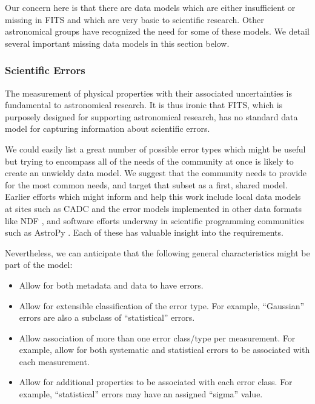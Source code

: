 \documentclass[final,authoryear,5p,times,twocolumn]{elsarticle}
\begin{document}
{{Our concern here is that there are data models which are either
insufficient or missing in FITS and which are very basic to scientific
research. Other astronomical groups have recognized the need for some of
these models. We detail
several important missing data models in this section below.

\subsubsection{Scientific Errors}


The measurement of physical properties with their associated uncertainties 
is fundamental to astronomical
research. It is thus ironic that FITS, which is purposely designed for
supporting astronomical research, has no standard data model for
capturing information about scientific errors.


We could easily list a great number of possible error types which
might be useful but trying to encompass all of the needs of the
community at once is likely to create an unwieldy data model. We
suggest that the community needs to provide for the most common needs,
and target that subset as a first, shared model. Earlier efforts which
might inform and help this work include local data models at sites
such as CADC \citep{2012ASPC..461..339D} and the error
models implemented in other data formats like NDF
\citep[although see for example][]{1991STARB...8...19M}, and software
efforts underway in scientific programming communities such as AstroPy
\citep{2013A&A...558A..33A}. Each of these has valuable insight into
the requirements.


Nevertheless, we can anticipate that the following general
characteristics might be part of the model:

\begin{itemize}
\item Allow for both metadata and data to have errors.

\item Allow for extensible classification of the error type. For example,
``Gaussian'' errors are also a subclass of ``statistical'' errors.

\item Allow association of more than one error class/type per
measurement. For example, allow for both systematic and statistical
errors to be associated with each measurement.

\item Allow for additional properties to be associated with each error
class. For example, ``statistical'' errors may have an assigned ``sigma''
value.
\end{itemize}

}}
\end{document}
